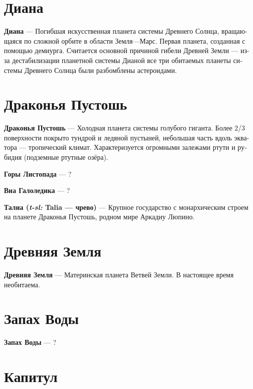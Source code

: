 \documentclass[a4paper,12pt,fleqn]{book}\usepackage{polyglossia}\setdefaultlanguage[babelshorthands=true]{russian}\setotherlanguage{english}\defaultfontfeatures{Ligatures=TeX,Mapping=tex-text}\usepackage{xcolor}\newcommand{\ml}[3]{#2}
\newcommand{\asterism}{\vspace{1em}{\centering\Large\bfseries$\ast~\ast~\ast$\par}\vspace{1em}}
\newcommand{\theterm}[3]{\textbf{\hypertarget{#1}{#2}} --- #3}
\newcommand{\theorigin}[3]{\textit{#1:} #2 --- #3}
\begin{document}
\section{Диана}

\theterm{diana}
{Диана}
{Погибшая искусственная планета системы Древнего Солнца, вращающаяся по сложной орбите в области Земля---Марс.
Первая планета, созданная с помощью демиурга.
Считается основной причиной гибели Древней Земли --- из-за дестабилизации планетной системы Дианой все три обитаемых планеты системы Древнего Солнца были разбомблены астероидами.}

\section{Драконья Пустошь}

\theterm{drake-desert}
{Драконья Пустошь}
{Холодная планета системы голубого гиганта.
Более 2/3 поверхности покрыто тундрой и ледяной пустыней, небольшая часть вдоль экватора --- тропический климат.
Характеризуется огромными залежами ртути и рубидия (подземные ртутные озёра).}

\asterism

\theterm{dropleaf-mountains}
{Горы Листопада}
{?}

\theterm{via-galoledica}
{Виа Галоледика}
{?}

\theterm{talia}
{Талиа (\theorigin{t-sl}{Talia}{чрево})}
{Крупное государство с монархическим строем на планете Драконья Пустошь, родном мире Аркадиу Люпино.}

\section{Древняя Земля}

\theterm{old-earth}
{Древняя Земля}
{Материнская планета Ветвей Земли.
В настоящее время необитаема.}

\section{Запах Воды}

\theterm{smellwater}
{Запах Воды}
{?}

\section{Капитул}
\end{document}

